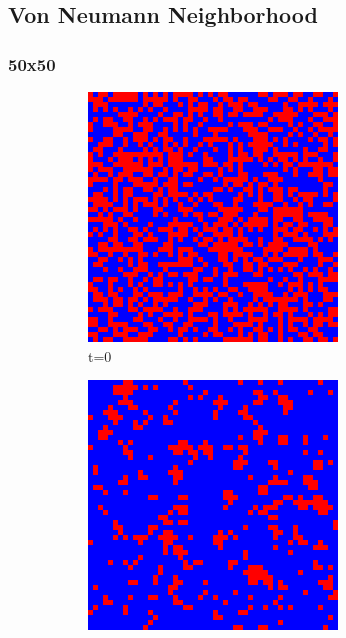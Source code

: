 \documentclass[a4paper, 11pt]{article}
\begin{document}
\newpage

\subsection{Von Neumann Neighborhood}

\subsubsection{50x50}
\begin{figure}[H]
\centering
\begin{subfigure}{.25\textwidth}
  \centering
  \includegraphics[width=0.9\linewidth]{PRISONERS_DILEMMA_VON_NEUMANN_50x50_t00}
  \caption{t=0}
\end{subfigure}%
\begin{subfigure}{.25\textwidth}
  \centering
  \includegraphics[width=0.9\linewidth]{PRISONERS_DILEMMA_VON_NEUMANN_50x50_t01}

\end{subfigure}
\end{figure}
\end{document}
